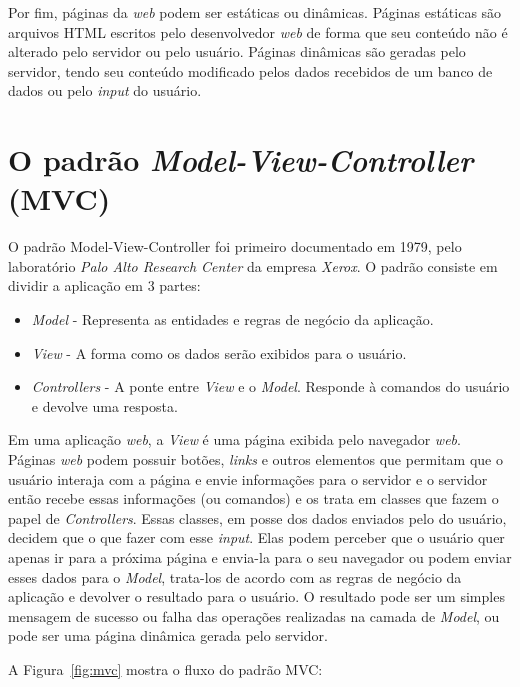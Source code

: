 Por fim, páginas da \textit{web} podem ser estáticas ou dinâmicas. 
Páginas estáticas são arquivos HTML escritos pelo desenvolvedor \textit{web} de forma que seu conteúdo não é alterado pelo servidor ou pelo usuário.
Páginas dinâmicas são geradas pelo servidor, tendo seu conteúdo modificado pelos dados recebidos de um banco de dados ou pelo \textit{input} do usuário.

\section{O padrão \textit{Model-View-Controller} (MVC)}

O padrão Model-View-Controller foi primeiro documentado em 1979, pelo laboratório \textit{Palo Alto Research Center} da empresa \textit{Xerox}.
O padrão consiste em dividir a aplicação em 3 partes:

\begin{itemize}
  \item \textit{Model} - Representa as entidades e regras de negócio da aplicação.
  \item \textit{View} - A forma como os dados serão exibidos para o usuário.
  \item \textit{Controllers} - A ponte entre \textit{View} e o \textit{Model}. Responde à comandos do usuário e devolve uma resposta.
\end{itemize}

Em uma aplicação \textit{web}, a \textit{View} é uma página exibida pelo navegador \textit{web}. 
Páginas \textit{web} podem possuir botões, \textit{links} e outros elementos que permitam que o usuário interaja com a página e envie informações para o servidor e
o servidor então recebe essas informações (ou comandos) e os trata em classes que fazem o papel de \textit{Controllers}.
Essas classes, em posse dos dados enviados pelo do usuário, decidem que o que fazer com esse \textit{input}. 
Elas podem perceber que o usuário quer apenas ir para a próxima página e envia-la para o seu navegador ou podem enviar esses dados para o \textit{Model}, trata-los de acordo com as regras de negócio da aplicação e devolver o resultado para o usuário.
O resultado pode ser um simples mensagem de sucesso ou falha das operações realizadas na camada de \textit{Model}, ou pode ser uma página dinâmica gerada pelo servidor.

A Figura~\ref{fig:mvc} mostra o fluxo do padrão MVC:


